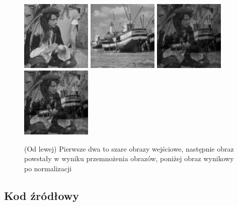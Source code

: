 \documentclass[final,a4paper,openany,12pt]{mwbk}
\begin{document}
\begin{figure}[H]
	\begin{center}
		\includegraphics[width=0.3\textwidth]{2/2Gray_Img1_Multipl_Original}
		\includegraphics[width=0.3\textwidth]{2/2Gray_Img2_Multipl_Original}
		\includegraphics[width=0.3\textwidth]{2/2Gray_Img_Multipl_Result}
		\includegraphics[width=0.3\textwidth]{2/2Gray_Img_Multipl_Result_Norm}
	\end{center}
	\caption{(Od lewej) Pierwsze dwa to szare obrazy wejściowe, następnie obraz powstały w wyniku przemnożenia obrazów, poniżej obraz wynikowy po normalizacji }
\end{figure}

\subsection*{Kod źródłowy}
\end{document}
